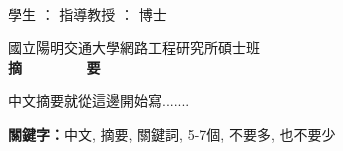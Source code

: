 
  \begin{center}
	\large
    \begin{singlespace}    
      \textbf{\chineseTitle{}} \\[0.5cm]
    \end{singlespace}
    
    \begin{singlespace}    

    	學生      ：\studentCnName{}  \hspace{2.5cm}  指導教授  ：\advisorCnName \hspace{0.1cm} 博士 \\
         [0.5cm]

    \end{singlespace}
    

    國立陽明交通大學網路工程研究所碩士班 \\[0.5cm]
    \textbf{摘~~~~~~~~要} \\[0.5cm]

  \end{center}
  \normalsize 
  中文摘要就從這邊開始寫.......

  \vspace{1cm}

  \textbf{關鍵字：}中文, 摘要, 關鍵詞, 5-7個, 不要多, 也不要少
